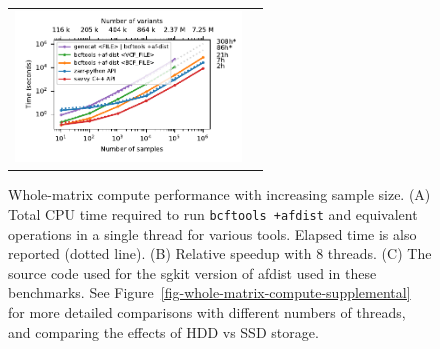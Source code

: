 \documentclass[a4paper,num-refs]{oup-contemporary}
\begin{document}
\begin{figure}
\begin{tabular}{cc}
\includegraphics[width=6cm]{figures/whole-matrix-compute} &

\end{tabular}
\caption{Whole-matrix compute performance with increasing sample size.
(A) Total CPU time required to run \texttt{bcftools +afdist}
and equivalent operations in a single thread for various tools.
Elapsed time is also reported (dotted line).
(B) Relative speedup with 8 threads.
(C) The source code used for the sgkit version of afdist used in these
benchmarks. See Figure~\ref{fig-whole-matrix-compute-supplemental} for
more detailed comparisons with different numbers of threads, and comparing
the effects of HDD vs SSD storage.
\label{fig-whole-matrix-compute}}
\end{figure}
\end{document}
